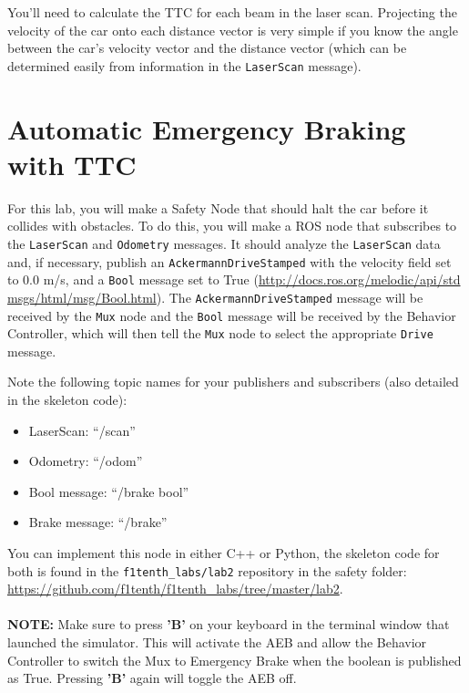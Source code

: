\documentclass[letta4 paper]{article}
\numberwithin{equation}{section}
\newcommand{\0}{\mathbf{0}}
\begin{document}
	You'll need to calculate the TTC for each beam in the laser scan. Projecting the velocity of the car onto each distance vector is very simple if you know the angle between the car’s velocity vector and the distance vector (which can be determined easily from information in the \texttt{LaserScan} message).
	
	\section{Automatic Emergency Braking with TTC}
	
	For this lab, you will make a Safety Node that should halt the car before it collides with obstacles. To do this, you will make a ROS node that subscribes to the \texttt{LaserScan} and \texttt{Odometry} messages. It should analyze the \texttt{LaserScan} data and, if necessary, publish an \texttt{AckermannDriveStamped} with the velocity field set to 0.0 m/s, and a \texttt{Bool} message set to True (\url{http://docs.ros.org/melodic/api/std msgs/html/msg/Bool.html}). The \texttt{AckermannDriveStamped} message will be received by the \texttt{Mux} node and the \texttt{Bool} message will be received by the Behavior Controller, which will then tell the \texttt{Mux} node to select the appropriate \texttt{Drive} message.
	
	Note the following topic names for your publishers and subscribers (also detailed in the skeleton code): 
	
	\begin{itemize}
		\item LaserScan: “/scan”
		\item Odometry: “/odom”
		\item Bool message: “/brake bool”
		\item Brake message: “/brake”
	\end{itemize}
	
	You can implement this node in either C++ or Python, the skeleton code for both is found in the \texttt{f1tenth\_labs/lab2} repository in the safety folder: \url{https://github.com/f1tenth/f1tenth_labs/tree/master/lab2}.
	\\
	\\
	\textbf{NOTE:} Make sure to press \textbf{’B’} on your keyboard in the terminal window that launched the simulator. This will activate the AEB and allow the Behavior Controller to switch the Mux to Emergency Brake when the boolean is published as True. Pressing \textbf{’B’} again will toggle the AEB off.
	
\end{document}
